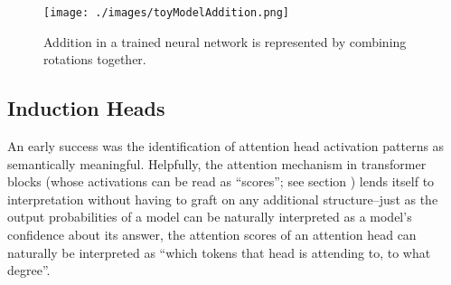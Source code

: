 \begin{figure}[ht]
\centering
\texttt{[image: ./images/toyModelAddition.png]}
\caption[From \cite{nanda2023progress}.]{ Addition in a trained neural network
      is represented by combining rotations together. }
\label{toyModelAddition}
\end{figure}



\subsection{Induction Heads}

An early success was the identification of
attention head activation patterns as semantically meaningful. Helpfully, the
attention mechanism in transformer blocks (whose activations can be read as
``scores''; see section ) lends itself to
interpretation without having to graft on any additional structure--just as
the output probabilities of a model can be naturally interpreted as a model's
confidence about its answer, the attention scores of an attention head can
naturally be interpreted as ``which tokens that head is attending to, to what
degree''.

